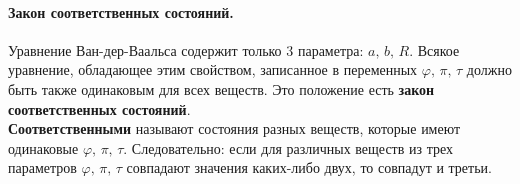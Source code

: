 \paragraph{Закон соответственных состояний.}Уравнение Ван-дер-Ваальса содержит только 3 параметра: $a,\,b,\,R$. Всякое уравнение, обладающее этим свойством, записанное в переменных $\varphi,\,\pi,\,\tau$ должно быть также одинаковым для всех веществ. Это положение есть \textbf{закон соответственных состояний}.\\
\textbf{Соответственными} называют состояния разных веществ, которые имеют одинаковые $\varphi,\,\pi,\,\tau$. Следовательно: если для различных веществ из трех параметров $\varphi,\,\pi,\,\tau$ совпадают значения каких-либо двух, то совпадут и третьи.
